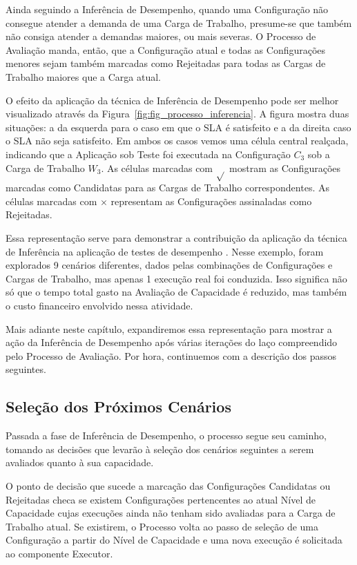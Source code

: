 Ainda seguindo a Inferência de Desempenho, quando uma Configuração não consegue
atender a demanda de uma Carga de Trabalho, presume-se que também não consiga
atender a demandas maiores, ou mais severas. O Processo de Avaliação manda, então,
que a Configuração atual e todas as Configurações menores sejam também marcadas
como Rejeitadas para todas as Cargas de Trabalho maiores que a Carga atual. 

O efeito da aplicação da técnica de Inferência de Desempenho pode ser melhor
visualizado através da Figura~\ref{fig:fig_processo_inferencia}. A figura mostra 
duas situações: a da esquerda para o caso em que o SLA é satisfeito e a da direita 
caso o SLA não seja satisfeito. Em ambos os casos vemos uma célula central realçada, 
indicando que a Aplicação sob Teste foi executada na Configuração $C_3$ sob a 
Carga de Trabalho $W_3$. As células marcadas com $\sqrt{}$ mostram as Configurações
marcadas como Candidatas para as Cargas de Trabalho correspondentes. As células
marcadas com $\times{}$ representam as Configurações assinaladas como Rejeitadas.

Essa representação serve para demonstrar a contribuição da aplicação da técnica 
de Inferência na aplicação de testes de desempenho . Nesse exemplo, foram 
explorados 9 cenários diferentes, dados pelas combinações de Configurações e 
Cargas de Trabalho, mas apenas 1 execução real foi conduzida. Isso significa não
só que o tempo total gasto na Avaliação de Capacidade é reduzido, mas também o
custo financeiro envolvido nessa atividade. 

Mais adiante neste capítulo, expandiremos essa representação para mostrar a ação
da Inferência de Desempenho após várias iterações do laço compreendido pelo 
Processo de Avaliação. Por hora, continuemos com a descrição dos passos seguintes.

\subsection{Seleção dos Próximos Cenários}
Passada a fase de Inferência de Desempenho, o processo segue seu caminho, tomando
as decisões que levarão à seleção dos cenários seguintes a serem avaliados quanto
à sua capacidade.

O ponto de decisão que sucede a marcação das Configurações Candidatas ou Rejeitadas
checa se existem Configurações pertencentes ao atual Nível de Capacidade cujas 
execuções ainda não tenham sido avaliadas para a Carga de Trabalho atual. Se 
existirem, o Processo volta ao passo de seleção de uma Configuração a partir do 
Nível de Capacidade e uma nova execução é solicitada ao componente Executor.

